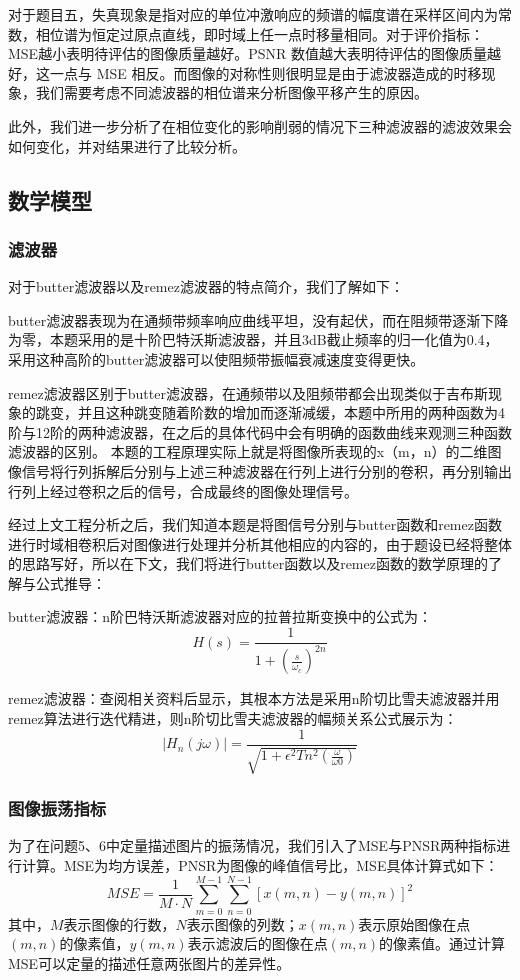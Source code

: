 \documentclass{article}
\begin{document}
对于题目五，失真现象是指对应的单位冲激响应的频谱的幅度谱在采样区间内为常数，相位谱为恒定过原点直线，即时域上任一点时移量相同。对于评价指标：MSE越小表明待评估的图像质量越好。PSNR 数值越大表明待评估的图像质量越好，这一点与 MSE 相反。而图像的对称性则很明显是由于滤波器造成的时移现象，我们需要考虑不同滤波器的相位谱来分析图像平移产生的原因。

此外，我们进一步分析了在相位变化的影响削弱的情况下三种滤波器的滤波效果会如何变化，并对结果进行了比较分析。

\subsection{数学模型}
\subsubsection{滤波器}
对于butter滤波器以及remez滤波器的特点简介，我们了解如下：


butter滤波器表现为在通频带频率响应曲线平坦，没有起伏，而在阻频带逐渐下降为零，本题采用的是十阶巴特沃斯滤波器，并且3dB截止频率的归一化值为0.4，采用这种高阶的butter滤波器可以使阻频带振幅衰减速度变得更快。


remez滤波器区别于butter滤波器，在通频带以及阻频带都会出现类似于吉布斯现象的跳变，并且这种跳变随着阶数的增加而逐渐减缓，本题中所用的两种函数为4阶与12阶的两种滤波器，在之后的具体代码中会有明确的函数曲线来观测三种函数滤波器的区别。
本题的工程原理实际上就是将图像所表现的x（m，n）的二维图像信号将行列拆解后分别与上述三种滤波器在行列上进行分别的卷积，再分别输出行列上经过卷积之后的信号，合成最终的图像处理信号。


经过上文工程分析之后，我们知道本题是将图信号分别与butter函数和remez函数进行时域相卷积后对图像进行处理并分析其他相应的内容的，由于题设已经将整体的思路写好，所以在下文，我们将进行butter函数以及remez函数的数学原理的了解与公式推导：


butter滤波器：n阶巴特沃斯滤波器对应的拉普拉斯变换中的公式为：
\begin{equation}
H(s)=\frac{1}{1+\left(\frac{s}{\omega_c}\right)^{2 n}}
\end{equation}


remez滤波器：查阅相关资料后显示，其根本方法是采用n阶切比雪夫滤波器并用remez算法进行迭代精进，则n阶切比雪夫滤波器的幅频关系公式展示为：
\begin{equation}
|H_n(j \omega)|=\frac{1}{\sqrt{1+\epsilon^2 T n^2\left(\frac{\omega}{\omega 0}\right)}} 
\end{equation}
\subsubsection{图像振荡指标}
为了在问题5、6中定量描述图片的振荡情况，我们引入了MSE与PNSR两种指标进行计算\cite{MENG2023400}。MSE为均方误差，PNSR为图像的峰值信号比，MSE具体计算式如下：
\begin{equation}
M S E=\frac{1}{M \cdot N} \sum_{m=0}^{M-1} \sum_{n=0}^{N-1}[x(m, n)-y(m, n)]^2\label{con:MSE}
\end{equation}
其中，$M$表示图像的行数，$N$表示图像的列数；$x(m,n)$表示原始图像在点$(m,n)$的像素值，$y(m,n)$表示滤波后的图像在点$(m,n)$的像素值。通过计算MSE可以定量的描述任意两张图片的差异性。
\end{document}
